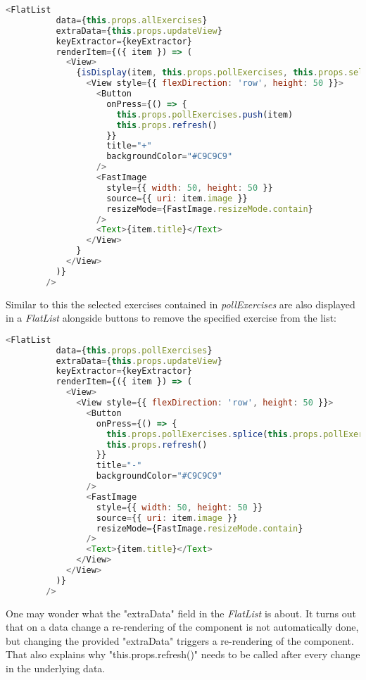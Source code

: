 \begin{lstlisting}[language=javascript, caption=\textit{FlatList} Selectable, label=lst:selectListPick]
        <FlatList
          data={this.props.allExercises}
          extraData={this.props.updateView}
          keyExtractor={keyExtractor}
          renderItem={({ item }) => (
            <View>
              {isDisplay(item, this.props.pollExercises, this.props.selectedExercises) &&
                <View style={{ flexDirection: 'row', height: 50 }}>
                  <Button
                    onPress={() => {
                      this.props.pollExercises.push(item)
                      this.props.refresh()
                    }}
                    title="+"
                    backgroundColor="#C9C9C9"
                  />
                  <FastImage
                    style={{ width: 50, height: 50 }}
                    source={{ uri: item.image }}
                    resizeMode={FastImage.resizeMode.contain}
                  />
                  <Text>{item.title}</Text>
                </View>
              }
            </View>
          )}
        />
\end{lstlisting}

Similar to this the selected exercises contained in \textit{pollExercises} are also displayed in a \textit{FlatList} alongside buttons to remove the specified exercise from the list:

\begin{lstlisting}[language=javascript, caption=\textit{FlatList} Selected, label=lst:selectListSelected]
        <FlatList
          data={this.props.pollExercises}
          extraData={this.props.updateView}
          keyExtractor={keyExtractor}
          renderItem={({ item }) => (
            <View>
              <View style={{ flexDirection: 'row', height: 50 }}>
                <Button
                  onPress={() => {
                    this.props.pollExercises.splice(this.props.pollExercises.indexOf(item), 1)
                    this.props.refresh()
                  }}
                  title="-"
                  backgroundColor="#C9C9C9"
                />
                <FastImage
                  style={{ width: 50, height: 50 }}
                  source={{ uri: item.image }}
                  resizeMode={FastImage.resizeMode.contain}
                />
                <Text>{item.title}</Text>
              </View>
            </View>
          )}
        />
\end{lstlisting}

One may wonder what the "extraData" field in the \textit{FlatList} is about. It turns out that on a data change a re-rendering of the component is not automatically done, but changing the provided "extraData" triggers a re-rendering of the component. That also explains why "this.props.refresh()" needs to be called after every change in the underlying data.

